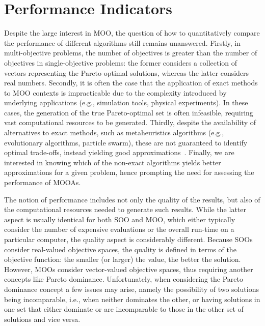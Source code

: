 \section{Performance Indicators}

Despite the large interest in \ac{MOO}, the question of how to quantitatively compare the performance of different algorithms still remains unanswered. Firstly, in multi-objective problems, the number of objectives is greater than the number of objectives in single-objective problems: the former considers a collection of vectors representing the Pareto-optimal solutions, whereas the latter considers real numbers. Secondly, it is often the case that the application of exact methods to \ac{MOO} contexts is impracticable due to the complexity introduced by underlying applications (e.g., simulation tools, physical experiments). In these cases, the generation of the true Pareto-optimal set is often infeasible, requiring vast computational resources to be generated. Thirdly, despite the availability of alternatives to exact methods, such as metaheuristics algorithms (e.g., evolutionary algorithms, particle swarm), these are not guaranteed to identify optimal trade-offs, instead yielding good approximations~\cite{Zitzler2003Metrics}. Finally, we are interested in knowing which of the non-exact algorithms yields better approximations for a given problem, hence prompting the need for assessing the performance of \acp{MOOA}.

The notion of performance includes not only the quality of the results, but also of the computational resources needed to generate such results. While the latter aspect is usually identical for both \ac{SOO} and \ac{MOO}, which either typically consider the number of expensive evaluations or the overall run-time on a particular computer, the quality aspect is considerably different. Because \acp{SOO} consider real-valued objective spaces, the quality is defined in terms of the objective function: the smaller (or larger) the value, the better the solution. However, \acp{MOO} consider vector-valued objective spaces, thus requiring another concepts like Pareto dominance. Unfortunately, when considering the Pareto dominance concept a few issues may arise, namely the possibility of two solutions being incomparable, i.e., when neither dominates the other, or having solutions in one set that either dominate or are incomparable to those in the other set of solutions and vice versa. 

